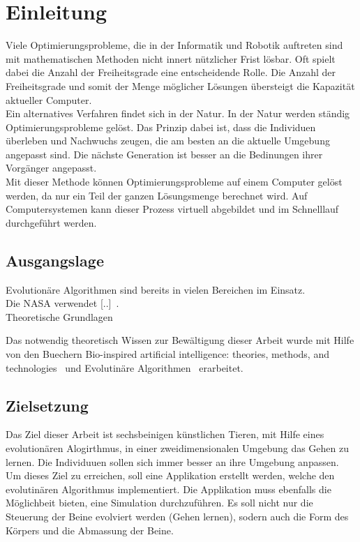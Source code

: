 %
%


\chapter{Einleitung}

  Viele Optimierungsprobleme,
  die in der Informatik und Robotik auftreten sind mit mathematischen Methoden nicht innert nützlicher Frist lösbar.
  Oft spielt dabei die Anzahl der Freiheitsgrade eine entscheidende Rolle.
  Die Anzahl der Freiheitsgrade und somit der Menge möglicher Lösungen übersteigt die Kapazität aktueller Computer.
  \\
  Ein alternatives Verfahren findet sich in der Natur. In der Natur werden ständig Optimierungsprobleme gelöst.
  Das Prinzip dabei ist, dass die Individuen überleben und Nachwuchs zeugen,
  die am besten an die aktuelle Umgebung angepasst sind.
  Die nächste Generation ist besser an die Bedinungen ihrer Vorgänger angepasst. %
  \\
  Mit dieser Methode können Optimierungsprobleme auf einem Computer gelöst werden,
  da nur ein Teil der ganzen Lösungsmenge berechnet wird.
  Auf Computersystemen kann dieser Prozess virtuell abgebildet und im Schnelllauf durchgeführt werden.
  \\

  \section{Ausgangslage}


    Evolutionäre Algorithmen sind bereits in vielen Bereichen im Einsatz.
    \\
    Die NASA verwendet [..]~\cite{Hornby2006}.
    \\
    Theoretische Grundlagen

    Das notwendig theoretisch Wissen zur Bewältigung dieser Arbeit wurde mit Hilfe von den Buechern
    Bio-inspired artificial intelligence: theories, methods, and technologies~\citet{book:bioInspired} und
    Evolutinäre Algorithmen~\citet{book:evAlgo} erarbeitet.


\section{Zielsetzung}
  Das Ziel dieser Arbeit ist sechsbeinigen künstlichen Tieren, mit Hilfe eines evolutionären Alogirthmus, in einer zweidimensionalen Umgebung das Gehen zu lernen.
  Die Individuuen sollen sich immer besser an ihre Umgebung anpassen.
  Um dieses Ziel zu erreichen, soll eine Applikation erstellt werden, welche den evolutinären Algorithmus implementiert.
  Die Applikation muss ebenfalls die Möglichbeit bieten, eine Simulation durchzuführen.
  Es soll nicht nur die Steuerung der Beine evolviert werden (Gehen lernen), sodern auch die Form des Körpers und die Abmassung der Beine.

